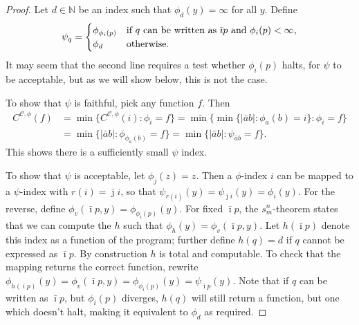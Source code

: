 \documentclass{style/llncs}
\newcommand{\C}{\mathscr C}
\newcommand{\N}{\mathbb N}
\newcommand{\tn}[1]{\textnormal{#1}}
\begin{document}
\begin{proof}
Let $d \in \N$ be an index such that $\phi_d(y)=\infty$ for all $y$. Define
  \[\psi_q=\begin{cases}
    \phi_{\phi_i(p)}&\tn{if $q$ can be written as $\bar\imath p$ and $\phi_i(p)<\infty$,}\\
    \phi_d&\tn{otherwise.}\end{cases}
  \]
It may seem that the second line requires a test whether $\phi_i(p)$ halts, for $\psi$ to be acceptable, but as we will show below, this is not the case.  
  
To show that $\psi$ is faithful, pick any function $f$. Then
\[\begin{split}
C^{\C, \phi}(f)&=\min\{C^{\C, \phi}(i):\phi_i=f\} =\min\{\min\{|\bar a b|:\phi_a(b)=i\}:\phi_i=f\} \\
& =\min\{|\bar a b|:\phi_{\phi_a(b)}=f\}
 =\min\{|\bar a b|:\psi_{\bar a b}=f\}.
\end{split}\]
This shows there is a sufficiently small $\psi$ index.

To show that $\psi$ is acceptable, let $\phi_j(z)=z$. Then a $\phi$-index $i$ can be mapped to a $\psi$-index
with $r(i)=\bar\jmath i$, so that
$\psi_{r(i)}(y)=\psi_{\bar\jmath i}(y)=\phi_i(y)$. For the reverse,
define $\phi_v(\bar\imath p, y)=\phi_{\phi_i(p)}(y)$. For fixed
$\bar\imath p$, the 
$s^n_m$-theorem \cite{kleene193notation} states that we can compute the $h$
such that $\phi_h(y)=\phi_v(\bar\imath p,y)$. Let $h(\bar\imath p)$
denote this index as a function of the program; further define
$h(q)=d$ if $q$ cannot be expressed as $\bar\imath p$. By
construction $h$ is total and computable. To check that the mapping
returns the correct function, rewrite $\phi_{h(\bar\imath
  p)}(y)=\phi_v(\bar\imath p,y)=\phi_{\phi_i(p)}(y)=\psi_{\bar\imath p}(y)$.
Note that if $q$ can be written as $\bar \imath p$, but $\phi_i(p)$ diverges, $h(q)$ will still return a function, but one which doesn't halt, making it equivalent to $\phi_d$ as required. 
\end{proof}
\end{document}
